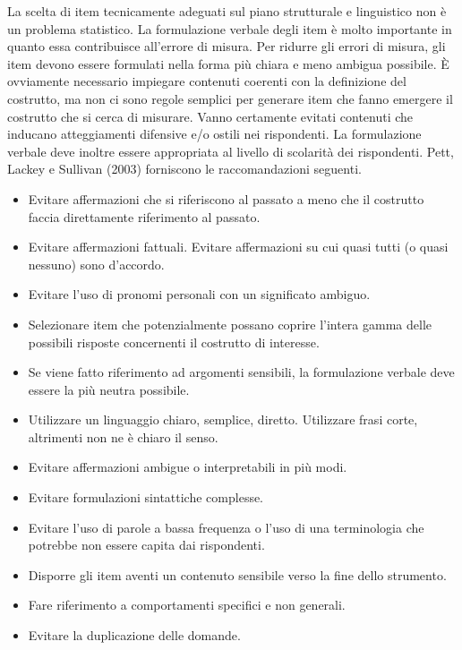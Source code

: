\documentclass[
  11pt,
]{krantz}
\providecommand{\tightlist}{%
  \setlength{\itemsep}{0pt}\setlength{\parskip}{0pt}}
\theoremstyle{definition}
\theoremstyle{definition}
\theoremstyle{definition}
\theoremstyle{definition}
\theoremstyle{remark}
\begin{document}
La scelta di item tecnicamente adeguati sul piano strutturale e linguistico non è un problema statistico. La formulazione verbale degli item è molto importante in quanto essa contribuisce all'errore di misura. Per ridurre gli errori di misura, gli item devono essere formulati nella forma più chiara e meno ambigua possibile. È ovviamente necessario impiegare contenuti coerenti con la definizione del costrutto, ma non ci sono regole semplici per generare item che fanno emergere il costrutto che si cerca di misurare. Vanno certamente evitati contenuti che inducano atteggiamenti difensive e/o ostili nei rispondenti. La formulazione verbale deve inoltre essere appropriata al livello di scolarità dei rispondenti. Pett, Lackey e Sullivan (2003) forniscono le raccomandazioni seguenti.

\begin{itemize}
\tightlist
\item
  Evitare affermazioni che si riferiscono al passato a meno che il costrutto faccia direttamente riferimento al passato.
\item
  Evitare affermazioni fattuali. Evitare affermazioni su cui quasi tutti (o quasi nessuno) sono d'accordo.
\item
  Evitare l'uso di pronomi personali con un significato ambiguo.
\item
  Selezionare item che potenzialmente possano coprire l'intera gamma delle possibili risposte concernenti il costrutto di interesse.
\item
  Se viene fatto riferimento ad argomenti sensibili, la formulazione verbale deve essere la più neutra possibile.
\item
  Utilizzare un linguaggio chiaro, semplice, diretto. Utilizzare frasi corte, altrimenti non ne è chiaro il senso.
\item
  Evitare affermazioni ambigue o interpretabili in più modi.
\item
  Evitare formulazioni sintattiche complesse.
\item
  Evitare l'uso di parole a bassa frequenza o l'uso di una terminologia che potrebbe non essere capita dai rispondenti.
\item
  Disporre gli item aventi un contenuto sensibile verso la fine dello strumento.
\item
  Fare riferimento a comportamenti specifici e non generali.
\item
  Evitare la duplicazione delle domande.
\end{itemize}
\end{document}
